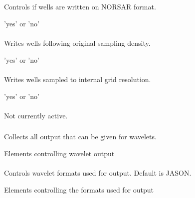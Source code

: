  \subparagraph{}
 \slist
   \item \Description Controls if wells are written on NORSAR format.
   \item \Argument 'yes' or 'no'
   \item \Default
 \elist

\paragraph{}
 \slist
   \item \Description Writes wells following original sampling density.
   \item \Argument 'yes' or 'no'
   \item \Default
 \elist

\paragraph{}
 \slist
   \item \Description Writes wells sampled to internal grid resolution.
   \item \Argument 'yes' or 'no'
   \item \Default
 \elist

\paragraph{}
 \slist
   \item \Description Not currently active.
   \item \Argument
   \item \Default
 \elist

\subsubsection{}
 \slist
   \item \Description Collects all output that can be given for wavelets.
   \item \Argument Elements controlling wavelet output
   \item \Default
 \elist

\paragraph{}
 \slist
   \item \Description Controls wavelet formats used for output. Default is JASON.
   \item \Argument Elements controlling the formats used for output
   \item \Default
 \elist


